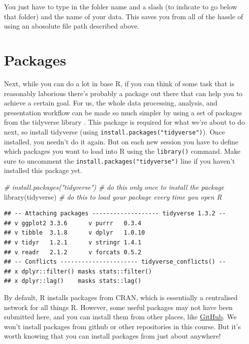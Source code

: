 \documentclass[
]{book}
\newenvironment{Shaded}{\begin{snugshade}}{\end{snugshade}}
\newcommand{\CommentTok}[1]{\textcolor[rgb]{0.56,0.35,0.01}{\textit{#1}}}
\newcommand{\FunctionTok}[1]{\textcolor[rgb]{0.00,0.00,0.00}{#1}}
\newcommand{\NormalTok}[1]{#1}
\begin{document}
You just have to type in the folder name and a slash (to indicate to go below that folder) and the name of your data. This saves you from all of the hassle of using an abosolute file path described above.

\hypertarget{packages}{%
\section{Packages}\label{packages}}

Next, while you can do a lot in base R, if you can think of some task that is reasonably laborious there's probably a package out there that can help you to achieve a certain goal. For us, the whole data processing, analysis, and presentation workflow can be made so much simpler by using a set of packages from the tidyverse library \citep{R-tidyverse}. This package is required for what we're about to do next, so install tidyverse (using \texttt{install.packages("tidyverse")}). Once installed, you needn't do it again. But on each new session you have to define which packages you want to load into R using the \texttt{library()} command. Make sure to uncomment the \texttt{install.packages("tidyverse")} line if you haven't installed this package yet.

\begin{Shaded}
\begin{Highlighting}[]
\CommentTok{\# install.packages("tidyverse") \# do this only once to install the package}
\FunctionTok{library}\NormalTok{(tidyverse) }\CommentTok{\# do this to load your package every time you open R}
\end{Highlighting}
\end{Shaded}

\begin{verbatim}
## -- Attaching packages ------------------- tidyverse 1.3.2 --
## v ggplot2 3.3.6      v purrr   0.3.4 
## v tibble  3.1.8      v dplyr   1.0.10
## v tidyr   1.2.1      v stringr 1.4.1 
## v readr   2.1.2      v forcats 0.5.2 
## -- Conflicts ---------------------- tidyverse_conflicts() --
## x dplyr::filter() masks stats::filter()
## x dplyr::lag()    masks stats::lag()
\end{verbatim}

By default, R installs packages from CRAN, which is essentially a centralised network for all things R. However, some useful packages may not have been submitted here, and you can install them from other places, like \href{https://github.com/}{GitHub}. We won't install packages from github or other repositories in this course. But it's worth knowing that you can install packages from just about anywhere!
\end{document}
